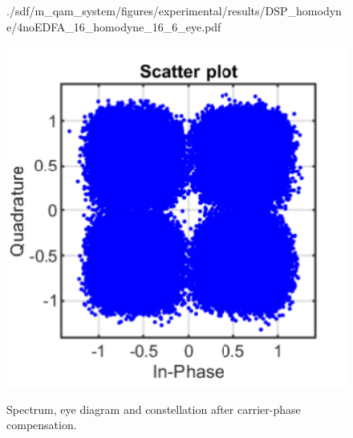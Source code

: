 \begin{figure}[H]
\begin{minipage}{0.30\textwidth}
			{./sdf/m_qam_system/figures/experimental/results/DSP_homodyne/4noEDFA_16_homodyne_16_6_eye.pdf}
			\label{fig:16GBdSpecMF}
		\end{minipage}
		\begin{minipage}{0.30\textwidth}
			\centering
			\includegraphics[width=1\textwidth]
			{./sdf/m_qam_system/figures/experimental/results/DSP_homodyne/4noEDFA_16_homodyne_16_6_const.pdf}\\
			\label{fig:16GBdSpecBefFec}
		\end{minipage}
		\caption{Spectrum, eye diagram and constellation after carrier-phase
		compensation.}
		\label{fig:16GBMFHm}
	\end{figure}


